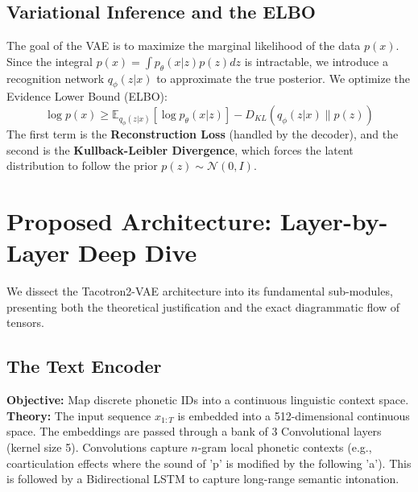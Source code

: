 \documentclass[12pt]{article}
\begin{document}
\subsection{Variational Inference and the ELBO}
The goal of the VAE is to maximize the marginal likelihood of the data $p(x)$. Since the integral $p(x) = \int p_\theta(x|z)p(z)dz$ is intractable, we introduce a recognition network $q_\phi(z|x)$ to approximate the true posterior. 
We optimize the Evidence Lower Bound (ELBO):
\begin{equation}
\log p(x) \geq \mathbb{E}_{q_\phi(z|x)}[\log p_\theta(x|z)] - D_{KL}(q_\phi(z|x) \| p(z))
\end{equation}
The first term is the \textbf{Reconstruction Loss} (handled by the decoder), and the second is the \textbf{Kullback-Leibler Divergence}, which forces the latent distribution to follow the prior $p(z) \sim \mathcal{N}(0, I)$.

\section{Proposed Architecture: Layer-by-Layer Deep Dive}

We dissect the Tacotron2-VAE architecture into its fundamental sub-modules, presenting both the theoretical justification and the exact diagrammatic flow of tensors.

\subsection{The Text Encoder}
\textbf{Objective:} Map discrete phonetic IDs into a continuous linguistic context space.
\\
\textbf{Theory:} The input sequence $x_{1:T}$ is embedded into a 512-dimensional continuous space. The embeddings are passed through a bank of 3 Convolutional layers (kernel size 5). Convolutions capture $n$-gram local phonetic contexts (e.g., coarticulation effects where the sound of 'p' is modified by the following 'a'). This is followed by a Bidirectional LSTM to capture long-range semantic intonation.
\end{document}
